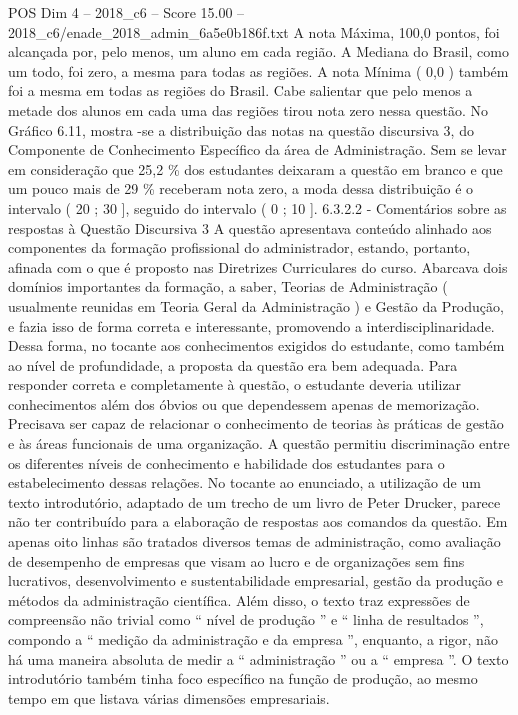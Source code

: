 \begin{textsample}{POS Dim 4 – 2018\_c6 – Score 15.00 – 2018\_c6/enade\_2018\_admin\_6a5e0b186f.txt}
A nota Máxima, 100,0 pontos, foi alcançada por, pelo menos, um aluno em cada região.
A Mediana do Brasil, como um todo, foi zero, a mesma para todas as regiões.
A nota Mínima ( 0,0 ) também foi a mesma em todas as regiões do Brasil.
Cabe salientar que pelo menos a metade dos alunos em cada uma das regiões tirou nota zero nessa questão.
No Gráfico 6.11, mostra -se a distribuição das notas na questão discursiva 3, do Componente de Conhecimento Específico da área de Administração.
Sem se levar em consideração que 25,2 \% dos estudantes deixaram a questão em branco e que um pouco mais de 29 \% receberam nota zero, a moda dessa distribuição é o intervalo ( 20 ; 30 ], seguido do intervalo ( 0 ; 10 ]. 6.3.2.2 - Comentários sobre as respostas à Questão Discursiva 3 A questão apresentava conteúdo alinhado aos componentes da formação profissional do administrador, estando, portanto, afinada com o que é proposto nas Diretrizes Curriculares do curso.
Abarcava dois domínios importantes da formação, a saber, Teorias de Administração ( usualmente reunidas em Teoria Geral da Administração ) e Gestão da Produção, e fazia isso de forma correta e interessante, promovendo a interdisciplinaridade.
Dessa forma, no tocante aos conhecimentos exigidos do estudante, como também ao nível de profundidade, a proposta da questão era bem adequada.
Para responder correta e completamente à questão, o estudante deveria utilizar conhecimentos além dos óbvios ou que dependessem apenas de memorização.
Precisava ser capaz de relacionar o conhecimento de teorias às práticas de gestão e às áreas funcionais de uma organização.
A questão permitiu discriminação entre os diferentes níveis de conhecimento e habilidade dos estudantes para o estabelecimento dessas relações.
No tocante ao enunciado, a utilização de um texto introdutório, adaptado de um trecho de um livro de Peter Drucker, parece não ter contribuído para a elaboração de respostas aos comandos da questão.
Em apenas oito linhas são tratados diversos temas de administração, como avaliação de desempenho de empresas que visam ao lucro e de organizações sem fins lucrativos, desenvolvimento e sustentabilidade empresarial, gestão da produção e métodos da administração científica.
Além disso, o texto traz expressões de compreensão não trivial como “ nível de produção ” e “ linha de resultados ”, compondo a “ medição da administração e da empresa ”, enquanto, a rigor, não há uma maneira absoluta de medir a “ administração ” ou a “ empresa ”.
O texto introdutório também tinha foco específico na função de produção, ao mesmo tempo em que listava várias dimensões empresariais.

\end{textsample}

